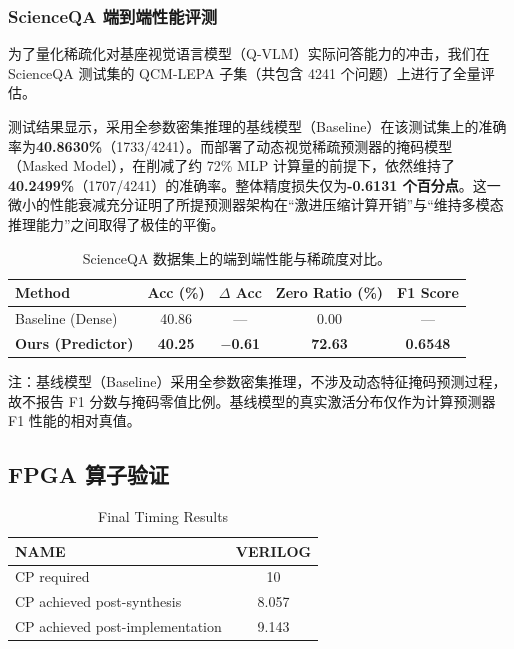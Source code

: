 \documentclass[sigconf]{acmart}
\begin{document}
	\subsubsection{ScienceQA 端到端性能评测 }
	为了量化稀疏化对基座视觉语言模型（Q-VLM）实际问答能力的冲击，我们在 ScienceQA 测试集的 QCM-LEPA 子集（共包含 4241 个问题）上进行了全量评估。
	
	测试结果显示，采用全参数密集推理的基线模型（Baseline）在该测试集上的准确率为\textbf{40.8630\%}（1733/4241）。而部署了动态视觉稀疏预测器的掩码模型（Masked Model），在削减了约 72\% MLP 计算量的前提下，依然维持了\textbf{40.2499\%}（1707/4241）的准确率。整体精度损失仅为\textbf{-0.6131 个百分点}。这一微小的性能衰减充分证明了所提预测器架构在“激进压缩计算开销”与“维持多模态推理能力”之间取得了极佳的平衡。
	
	\begin{table}[htbp]
		\centering
		\begin{threeparttable}
			\caption{ScienceQA 数据集上的端到端性能与稀疏度对比。}
			\label{tab:main_results}
			\begin{tabular}{lcccc}
				\toprule
				\textbf{Method} & \textbf{Acc (\%)} & \textbf{$\Delta$ Acc} & \textbf{Zero Ratio (\%)} & \textbf{F1 Score} \\
				\midrule
				Baseline (Dense)\tnote{*} & 40.86 & --- & 0.00 & --- \\
				\textbf{Ours (Predictor)} & \textbf{40.25} & \textbf{$-$0.61} & \textbf{72.63} & \textbf{0.6548} \\
				\bottomrule
			\end{tabular}
			\begin{tablenotes}
				\small
				\item[*] 注：基线模型（Baseline）采用全参数密集推理，不涉及动态特征掩码预测过程，故不报告 F1 分数与掩码零值比例。基线模型的真实激活分布仅作为计算预测器 F1 性能的相对真值。
			\end{tablenotes}
		\end{threeparttable}
	\end{table}
	
	\subsection{FPGA 算子验证}
	
	\begin{table}[htbp]
		\centering
		\caption{Final Timing Results}
		\label{tab:final_timing}
		\begin{tabular}{lc}
			\toprule
			\textbf{NAME} & \textbf{VERILOG} \\
			\midrule
			CP required & 10 \\
			CP achieved post-synthesis & 8.057 \\
			CP achieved post-implementation & 9.143 \\
			\bottomrule
		\end{tabular}
	\end{table}
	
\end{document}
